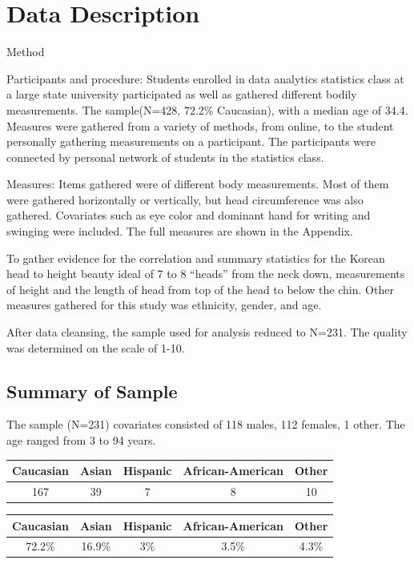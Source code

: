 \documentclass[]{article}
\begin{document}
\section{Data Description}
\label{sec:data}

Method

Participants and procedure: Students enrolled in data analytics
statistics class at a large state university participated as well as
gathered different bodily measurements. The sample(N=428, 72.2\%
Caucasian), with a median age of 34.4. Measures were gathered from a
variety of methods, from online, to the student personally gathering
measurements on a participant. The participants were connected by
personal network of students in the statistics class.

Measures: Items gathered were of different body measurements. Most of
them were gathered horizontally or vertically, but head circumference
was also gathered. Covariates such as eye color and dominant hand for
writing and swinging were included. The full measures are shown in the
Appendix.

To gather evidence for the correlation and summary statistics for the
Korean head to height beauty ideal of 7 to 8 \enquote{heads} from the
neck down, measurements of height and the length of head from top of the
head to below the chin. Other measures gathered for this study was
ethnicity, gender, and age.

After data cleansing, the sample used for analysis reduced to N=231. The
quality was determined on the scale of 1-10.

\subsection{Summary of Sample}
\label{sec:data-sample}

The sample (N=231) covariates consisted of 118 males, 112 females, 1
other. The age ranged from 3 to 94 years.\\
\vspace{5mm}

\begin{tabular}{ c c c c c}
  Caucasian & Asian & Hispanic & African-American & Other \\
  \hline
  167 & 39 & 7 & 8 & 10
\end{tabular}
\vspace{5mm}

\begin{tabular}{ c c c c c}
   Caucasian & Asian & Hispanic & African-American & Other \\
  \hline
  72.2\% & 16.9\% & 3\% & 3.5\% & 4.3\%
\end{tabular}
\end{document}
